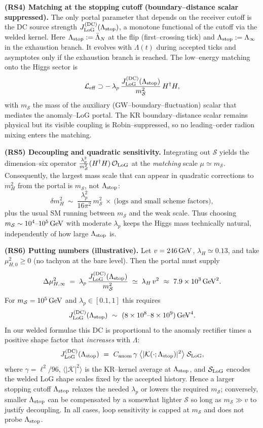 \documentclass[10pt]{article}
\theoremstyle{definition}
\theoremstyle{plain}
\begin{document}
\medskip
\noindent\textbf{(RS4) Matching at the stopping cutoff (boundary--distance scalar suppressed).}
The only portal parameter that depends on the receiver cutoff is the DC source strength
$J_{\rm LoG}^{\rm (DC)}(\Lambda_{\rm stop})$, a monotone functional of the cutoff via the welded kernel.
Here $\Lambda_{\rm stop}:=\bar\Lambda_N$ at the flip (first--crossing tick) and
$\Lambda_{\rm stop}:=\Lambda_\infty$ in the exhaustion branch. It evolves with $\Lambda(t)$ during accepted
ticks and asymptotes only if the exhaustion branch is reached. The low--energy matching onto the Higgs sector is
\[
\mathcal L_{\rm eff}\supset -\,\lambda_p\,\frac{J_{\rm LoG}^{\rm (DC)}(\Lambda_{\rm stop})}{m_{\mathcal S}^2}\,H^\dagger H,
\]
with $m_{\mathcal S}$ the mass of the auxiliary (GW--boundary--fluctuation) scalar that mediates the anomaly--LoG portal.
The KR boundary--distance scalar remains physical but its visible coupling is Robin--suppressed, so no leading--order
radion mixing enters the matching.

\medskip
\noindent\textbf{(RS5) Decoupling and quadratic sensitivity.}
Integrating out $\mathcal S$ yields the dimension–six operator
\(
\frac{\lambda_p^2}{m_{\mathcal S}^2}(H^\dagger H)\,\mathcal O_{\rm LoG}
\)
at the \emph{matching} scale $\mu\simeq m_{\mathcal S}$. Consequently, the largest mass scale that can appear in quadratic corrections to $m_H^2$ from the portal is $m_{\mathcal S}$, not $\Lambda_{\rm stop}$:
\[
\delta m_H^2\ \sim\ \frac{\lambda_p^2}{16\pi^2}\,m_{\mathcal S}^2\ \times\ \big(\text{logs and small scheme factors}\big),
\]
plus the usual SM running between $m_{\mathcal S}$ and the weak scale. Thus choosing $m_{\mathcal S}\sim 10^{4}\text{--}10^{5}\,{\rm GeV}$ with moderate $\lambda_p$ keeps the Higgs mass technically natural, independently of how large $\Lambda_{\rm stop}$ is.

\medskip
\noindent\textbf{(RS6) Putting numbers (illustrative).}
Let $v=246\,{\rm GeV}$, $\lambda_H\simeq 0.13$, and take $\mu_{H,0}^2\ge 0$ (no tachyon at the bare level). Then the portal must supply
\[
\Delta\mu_{H,\infty}^2\;=\;\lambda_p\,\frac{J_{\rm LoG}^{\rm (DC)}(\Lambda_{\rm stop})}{m_{\mathcal S}^2}\;\simeq\;\lambda_H\,v^2\ \approx\ 7.9\times 10^{3}\,{\rm GeV}^2.
\]
For $m_{\mathcal S}=10^{5}\,{\rm GeV}$ and $\lambda_p\in[0.1,1]$ this requires
\[
J_{\rm LoG}^{\rm (DC)}(\Lambda_{\rm stop})\ \sim\ (8\times 10^{8}\text{--}8\times 10^{9})\,{\rm GeV}^4.
\]
In our welded formulae this DC is proportional to the anomaly rectifier times a positive shape factor that \emph{increases} with $\Lambda$:
\[
J_{\rm LoG}^{\rm (DC)}(\Lambda_{\rm stop})\ =\ C_{\rm anom}\,\gamma\;\big\langle |\mathcal K(\cdot;\Lambda_{\rm stop})|^2\big\rangle\;\mathcal S_{\rm LoG},
\]
where $\gamma=\ell^2/96$, $\langle|\mathcal K|^2\rangle$ is the KR–kernel average at $\Lambda_{\rm stop}$, and $\mathcal S_{\rm LoG}$ encodes the welded LoG shape scales fixed by the accepted history. Hence a larger stopping cutoff \(\Lambda_{\rm stop}\) relaxes the needed $\lambda_p$ or lowers the required $m_{\mathcal S}$; conversely, smaller \(\Lambda_{\rm stop}\) can be compensated by a somewhat lighter $\mathcal S$ so long as $m_{\mathcal S}\gg v$ to justify decoupling. In all cases, loop sensitivity is capped at $m_{\mathcal S}$ and does not probe $\Lambda_{\rm stop}$.
\end{document}
